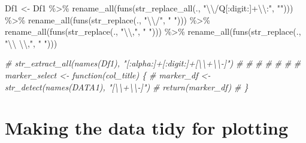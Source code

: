 \documentclass[
]{book}
\newenvironment{Shaded}{\begin{snugshade}}{\end{snugshade}}
\newcommand{\CommentTok}[1]{\textcolor[rgb]{0.56,0.35,0.01}{\textit{#1}}}
\newcommand{\FunctionTok}[1]{\textcolor[rgb]{0.00,0.00,0.00}{#1}}
\newcommand{\NormalTok}[1]{#1}
\newcommand{\OtherTok}[1]{\textcolor[rgb]{0.56,0.35,0.01}{#1}}
\newcommand{\SpecialCharTok}[1]{\textcolor[rgb]{0.00,0.00,0.00}{#1}}
\newcommand{\StringTok}[1]{\textcolor[rgb]{0.31,0.60,0.02}{#1}}
\begin{document}
\begin{Shaded}
\begin{Highlighting}[]
\NormalTok{Df1 }\OtherTok{\textless{}{-}}\NormalTok{ Df1 }\SpecialCharTok{\%\textgreater{}\%}
  \FunctionTok{rename\_all}\NormalTok{(}\FunctionTok{funs}\NormalTok{(}\FunctionTok{str\_replace\_all}\NormalTok{(., }\StringTok{"}\SpecialCharTok{\textbackslash{}\textbackslash{}}\StringTok{/Q[:digit:]+}\SpecialCharTok{\textbackslash{}\textbackslash{}}\StringTok{:"}\NormalTok{, }\StringTok{""}\NormalTok{))) }\SpecialCharTok{\%\textgreater{}\%}
  \FunctionTok{rename\_all}\NormalTok{(}\FunctionTok{funs}\NormalTok{(}\FunctionTok{str\_replace}\NormalTok{(., }\StringTok{"}\SpecialCharTok{\textbackslash{}\textbackslash{}}\StringTok{/"}\NormalTok{, }\StringTok{" "}\NormalTok{))) }\SpecialCharTok{\%\textgreater{}\%}
  \FunctionTok{rename\_all}\NormalTok{(}\FunctionTok{funs}\NormalTok{(}\FunctionTok{str\_replace}\NormalTok{(., }\StringTok{"}\SpecialCharTok{\textbackslash{}\textbackslash{}}\StringTok{,"}\NormalTok{, }\StringTok{" "}\NormalTok{))) }\SpecialCharTok{\%\textgreater{}\%}
  \FunctionTok{rename\_all}\NormalTok{(}\FunctionTok{funs}\NormalTok{(}\FunctionTok{str\_replace}\NormalTok{(., }\StringTok{"}\SpecialCharTok{\textbackslash{}\textbackslash{}}\StringTok{ }\SpecialCharTok{\textbackslash{}\textbackslash{}}\StringTok{,"}\NormalTok{, }\StringTok{" "}\NormalTok{)))}

\CommentTok{\# str\_extract\_all(names(Df1), "[:alpha:]+[:digit:]+[\textbackslash{}\textbackslash{}+\textbackslash{}\textbackslash{}{-}]")}
\CommentTok{\# }
\CommentTok{\# }
\CommentTok{\# }
\CommentTok{\# }
\CommentTok{\# }
\CommentTok{\# }
\CommentTok{\# marker\_select \textless{}{-} function(col\_title) \{}
\CommentTok{\#   marker\_df \textless{}{-} str\_detect(names(DATA1), "[\textbackslash{}\textbackslash{}+\textbackslash{}\textbackslash{}{-}]") }
\CommentTok{\#   return(marker\_df)}
\CommentTok{\# \}}
\end{Highlighting}
\end{Shaded}

\hypertarget{making-the-data-tidy-for-plotting}{%
\section{Making the data tidy for plotting}\label{making-the-data-tidy-for-plotting}}
\end{document}
